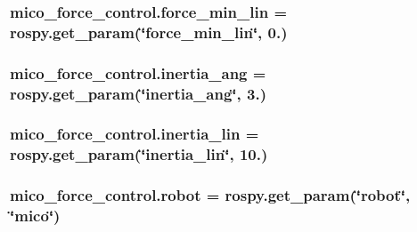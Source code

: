 \subsubsection[{\texorpdfstring{force\+\_\+min\+\_\+lin}{force_min_lin}}]{\setlength{\rightskip}{0pt plus 5cm}mico\+\_\+force\+\_\+control.\+force\+\_\+min\+\_\+lin = rospy.\+get\+\_\+param(\char`\"{}force\+\_\+min\+\_\+lin\char`\"{}, 0.)}\hypertarget{namespacemico__force__control_a0ceb8e5eca328f479981a597d6ca88b2}{}\label{namespacemico__force__control_a0ceb8e5eca328f479981a597d6ca88b2}
\subsubsection[{\texorpdfstring{inertia\+\_\+ang}{inertia_ang}}]{\setlength{\rightskip}{0pt plus 5cm}mico\+\_\+force\+\_\+control.\+inertia\+\_\+ang = rospy.\+get\+\_\+param(\char`\"{}inertia\+\_\+ang\char`\"{}, 3.)}\hypertarget{namespacemico__force__control_a15342e572c568a704fb5af7c5865eae3}{}\label{namespacemico__force__control_a15342e572c568a704fb5af7c5865eae3}
\subsubsection[{\texorpdfstring{inertia\+\_\+lin}{inertia_lin}}]{\setlength{\rightskip}{0pt plus 5cm}mico\+\_\+force\+\_\+control.\+inertia\+\_\+lin = rospy.\+get\+\_\+param(\char`\"{}inertia\+\_\+lin\char`\"{}, 10.)}\hypertarget{namespacemico__force__control_a7bd9a03e89cd1a75c5b5fd43fe20043d}{}\label{namespacemico__force__control_a7bd9a03e89cd1a75c5b5fd43fe20043d}
\subsubsection[{\texorpdfstring{robot}{robot}}]{\setlength{\rightskip}{0pt plus 5cm}mico\+\_\+force\+\_\+control.\+robot = rospy.\+get\+\_\+param(\char`\"{}robot\char`\"{}, \char`\"{}mico\char`\"{})}\hypertarget{namespacemico__force__control_ae3d8428c9fe2a197c78735d5e2bf7d13}{}\label{namespacemico__force__control_ae3d8428c9fe2a197c78735d5e2bf7d13}
